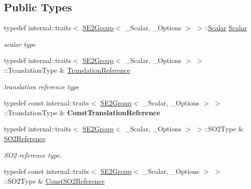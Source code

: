 \subsection*{Public Types}
\begin{DoxyCompactItemize}
\item 
typedef internal\+::traits$<$ \hyperlink{class_sophus_1_1_s_e2_group}{S\+E2\+Group}$<$ \+\_\+\+Scalar, \+\_\+\+Options $>$ $>$\+::\hyperlink{class_sophus_1_1_s_e2_group_a2c3f69904c79825984774d78a107ab35}{Scalar} \hyperlink{class_sophus_1_1_s_e2_group_a2c3f69904c79825984774d78a107ab35}{Scalar}\hypertarget{class_sophus_1_1_s_e2_group_a2c3f69904c79825984774d78a107ab35}{}\label{class_sophus_1_1_s_e2_group_a2c3f69904c79825984774d78a107ab35}

\begin{DoxyCompactList}\small\item\em scalar type \end{DoxyCompactList}\item 
typedef internal\+::traits$<$ \hyperlink{class_sophus_1_1_s_e2_group}{S\+E2\+Group}$<$ \+\_\+\+Scalar, \+\_\+\+Options $>$ $>$\+::Translation\+Type \& \hyperlink{class_sophus_1_1_s_e2_group_afa2e2598cfa5844e7d6a57b5c0b6a38a}{Translation\+Reference}\hypertarget{class_sophus_1_1_s_e2_group_afa2e2598cfa5844e7d6a57b5c0b6a38a}{}\label{class_sophus_1_1_s_e2_group_afa2e2598cfa5844e7d6a57b5c0b6a38a}

\begin{DoxyCompactList}\small\item\em translation reference type \end{DoxyCompactList}\item 
typedef const internal\+::traits$<$ \hyperlink{class_sophus_1_1_s_e2_group}{S\+E2\+Group}$<$ \+\_\+\+Scalar, \+\_\+\+Options $>$ $>$\+::Translation\+Type \& {\bfseries Const\+Translation\+Reference}\hypertarget{class_sophus_1_1_s_e2_group_aa74333930e3caebf50564bc2a40a6eff}{}\label{class_sophus_1_1_s_e2_group_aa74333930e3caebf50564bc2a40a6eff}

\item 
typedef internal\+::traits$<$ \hyperlink{class_sophus_1_1_s_e2_group}{S\+E2\+Group}$<$ \+\_\+\+Scalar, \+\_\+\+Options $>$ $>$\+::S\+O2\+Type \& \hyperlink{class_sophus_1_1_s_e2_group_a053aa9fd3ee6259f817472e7e4c46a06}{S\+O2\+Reference}\hypertarget{class_sophus_1_1_s_e2_group_a053aa9fd3ee6259f817472e7e4c46a06}{}\label{class_sophus_1_1_s_e2_group_a053aa9fd3ee6259f817472e7e4c46a06}

\begin{DoxyCompactList}\small\item\em S\+O2 reference type. \end{DoxyCompactList}\item 
typedef const internal\+::traits$<$ \hyperlink{class_sophus_1_1_s_e2_group}{S\+E2\+Group}$<$ \+\_\+\+Scalar, \+\_\+\+Options $>$ $>$\+::S\+O2\+Type \& \hyperlink{class_sophus_1_1_s_e2_group_a370e66451d1133612595dc3fb30e07cf}{Const\+S\+O2\+Reference}\hypertarget{class_sophus_1_1_s_e2_group_a370e66451d1133612595dc3fb30e07cf}{}\label{class_sophus_1_1_s_e2_group_a370e66451d1133612595dc3fb30e07cf}


\end{DoxyCompactItemize}
